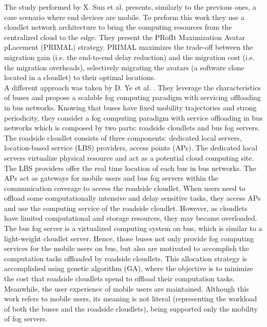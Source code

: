\noindent\tab The study performed by X. Sun et al. \cite{sun2016primal} presents, similarly to the previous ones, a case scenario where end devices are mobile. To preform this work they use a cloudlet network architecture to bring the computing resources from the centralized cloud to the edge. They present the PRofIt Maximization Avatar pLacement (PRIMAL) strategy. PRIMAL maximizes the trade-off between the migration gain (i.e. the end-to-end delay reduction) and the migration cost (i.e. the migration overheads), selectively migrating the avatars (a software clone located in a cloudlet) to their optimal locations.\\
\noindent\tab A different approach was taken by D. Ye et al. \cite{ye2016scalable}. They leverage the characteristics of buses and propose a scalable fog computing paradigm with servicing offloading in bus networks. Knowing that buses have fixed mobility trajectories and strong periodicity, they consider a fog computing paradigm with service offloading in bus networks which is composed by two parts: roadside cloudlets and bus fog servers. The roadside cloudlet consists of three components: dedicated local servers, location-based service (LBS) providers, access points (APs). The dedicated local servers virtualize physical resource and act as a potential cloud computing site. The LBS providers offer the real time location of each bus in bus networks. The APs act as gateways for mobile users and bus fog servers within the communication coverage to access the roadside cloudlet. When users need to offload some computationally intensive and delay sensitive tasks, they access APs and use the computing service of the roadside cloudlet. However, as cloudlets have limited computational and storage resources, they may became overloaded. The bus fog server is a virtualized computing system on bus, which is similar to a light-weight cloudlet server. Hence, those buses not only provide fog computing services for the mobile users on bus, but also are motivated to accomplish the computation tasks offloaded by roadside cloudlets. This allocation strategy is accomplished using genetic algorithm (GA), where the objective is to minimize the cost that roadside cloudlets spend to offload their computation tasks. Meanwhile, the user experience of mobile users are maintained. Although this work refers to mobile users, its meaning is not literal (representing the workload of both the buses and the roadside cloudlets), being supported only the mobility of fog servers. \\[6pt] %
